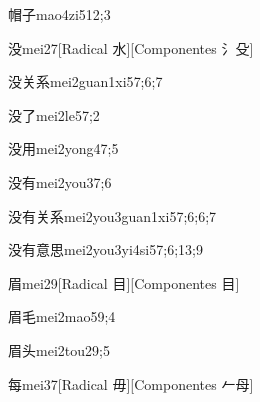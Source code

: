 \begin{verbete}{帽子}{mao4zi5}{12;3}
\end{verbete}

\begin{verbete}{没}{mei2}{7}[Radical 水][Componentes 氵殳]
\end{verbete}

\begin{verbete}{没关系}{mei2guan1xi5}{7;6;7}
\end{verbete}

\begin{verbete}{没了}{mei2le5}{7;2}
\end{verbete}

\begin{verbete}{没用}{mei2yong4}{7;5}
\end{verbete}

\begin{verbete}{没有}{mei2you3}{7;6}
\end{verbete}

\begin{verbete}{没有关系}{mei2you3guan1xi5}{7;6;6;7}
\end{verbete}

\begin{verbete}{没有意思}{mei2you3yi4si5}{7;6;13;9}
\end{verbete}

\begin{verbete}{眉}{mei2}{9}[Radical 目][Componentes 目]
\end{verbete}

\begin{verbete}{眉毛}{mei2mao5}{9;4}
\end{verbete}

\begin{verbete}{眉头}{mei2tou2}{9;5}
\end{verbete}

\begin{verbete}{每}{mei3}{7}[Radical 毋][Componentes 𠂉母]
\end{verbete}


